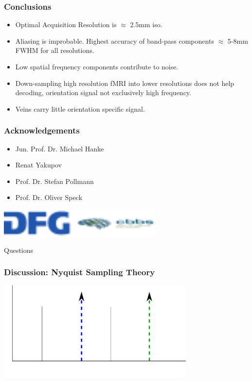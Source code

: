 \documentclass{beamer}
\begin{document}
  \begin{frame}
    \frametitle{Conclusions}
        \begin{center}
        \begin{itemize}
         \item Optimal Acquisition Resolution is $\approx$ 2.5mm iso.
         \item Aliasing is improbable. Highest accuracy of band-pass 
         components $\approx$ 5-8mm FWHM for all resolutions.
         \item Low spatial frequency components contribute to noise.
         \item Down-sampling high resolution fMRI into lower resolutions 
         does not help decoding, orientation signal not exclusively high frequency.
         \item Veins carry little orientation specific signal.
        \end{itemize}  
        \end{center}
    \end{frame} 

  \begin{frame}
    \frametitle{Acknowledgements}
        \begin{itemize}
         \item Jun. Prof. Dr. Michael Hanke
         \item Renat Yakupov
         \item Prof. Dr. Stefan Pollmann
         \item Prof. Dr. Oliver Speck
        \end{itemize}
        \vspace{1cm}
        \begin{center} 
            \includegraphics[height=1.5cm]{pics/funding}
        \end{center}
    \end{frame}


  \begin{frame}
        \begin{center}
            Questions
        \end{center}
    \end{frame} 
    
  \begin{frame}
    \frametitle{Discussion: Nyquist Sampling Theory}
        \begin{center}
            \includegraphics[height=5cm]{pics/nyquist}
        \end{center}
    \end{frame}                        
\end{document}
